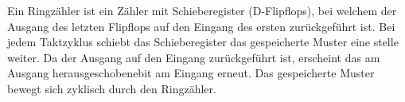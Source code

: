 Ein Ringzähler ist ein Zähler mit Schieberegister (D-Flipflops), bei welchem der
Ausgang des letzten Flipflops auf den Eingang des ersten zurückgeführt ist.
Bei jedem Taktzyklus schiebt das Schieberegister das gespeicherte Muster eine
stelle weiter. Da der Ausgang auf den Eingang zurückgeführt ist, erscheint das
am Ausgang \glqq herausgeschobene\grqq bit am Eingang erneut. Das gespeicherte
Muster bewegt sich zyklisch durch den Ringzähler.